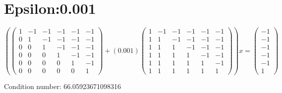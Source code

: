 \documentclass{article}%
\begin{document}
\section{Epsilon:0.001}%
\label{sec:Epsilon0.001}%
\[%
( \begin{pmatrix}%
1&-1&-1&-1&-1&-1\\%
0&1&-1&-1&-1&-1\\%
0&0&1&-1&-1&-1\\%
0&0&0&1&-1&-1\\%
0&0&0&0&1&-1\\%
0&0&0&0&0&1%
\end{pmatrix} + ( 0.001 ) \begin{pmatrix}%
1&-1&-1&-1&-1&-1\\%
1&1&-1&-1&-1&-1\\%
1&1&1&-1&-1&-1\\%
1&1&1&1&-1&-1\\%
1&1&1&1&1&-1\\%
1&1&1&1&1&1%
\end{pmatrix} )x = \begin{pmatrix}%
-1\\%
-1\\%
-1\\%
-1\\%
-1\\%
1%
\end{pmatrix}%
\]%
\begin{Large}%
Condition number:%
66.05923671098316%
\end{Large}

%
\end{document}
